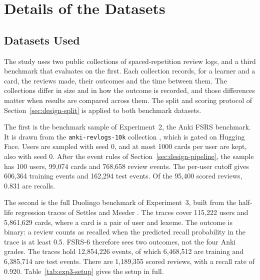 \chapter{Details of the Datasets}
\label{ch:dataset}

\section{Datasets Used}
\label{sec:dataset-used}

The study uses two public collections of spaced-repetition review logs, and a third benchmark that evaluates on the first. Each collection records, for a learner and a card, the reviews made, their outcomes and the time between them. The collections differ in size and in how the outcome is recorded, and those differences matter when results are compared across them. The split and scoring protocol of Section~\ref{sec:design-split} is applied to both benchmark datasets.

The first is the benchmark sample of Experiment~2, the Anki FSRS benchmark. It is drawn from the \texttt{anki-revlogs-10k} collection \cite{ankirevlogs10k}, which is gated on Hugging Face. Users are sampled with seed 0, and at most 1000 cards per user are kept, also with seed 0. After the event rules of Section~\ref{sec:design-pipeline}, the sample has 100 users, 99,074 cards and 768,658 review events. The per-user cutoff gives 606,364 training events and 162,294 test events. Of the 95,400 scored reviews, 0.831 are recalls.

The second is the full Duolingo benchmark of Experiment~3, built from the half-life regression traces of Settles and Meeder \cite{settles2016trainable}. The traces cover 115,222 users and 5,861,629 cards, where a card is a pair of user and lexeme. The outcome is binary: a review counts as recalled when the predicted recall probability in the trace is at least 0.5. FSRS-6 therefore sees two outcomes, not the four Anki grades. The traces hold 12,854,226 events, of which 6,468,512 are training and 6,385,714 are test events. There are 1,189,355 scored reviews, with a recall rate of 0.920. Table~\ref{tab:exp3-setup} gives the setup in full.

